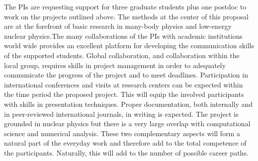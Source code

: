 The PIs are requesting support for three graduate students plus one postdoc to work on
the projects outlined above. The methods at the center of this proposal
are at the forefront of basic research in many-body physics and
low-energy nuclear physics.The many collaborations of the PIs with academic institutions world wide provides an excellent
platform for developing the communication skills of the supported
students. Global collaboration, and collaboration within the local
group, requires skills in project management in order to adequately
communicate the progress of the project and to meet
deadlines. Participation in international conferences and visits at
research centers can be expected within the time period the proposed
project. This will equip the involved participants with skills in
presentation techniques.  Proper documentation, both internally and in
peer-reviewed international journals, in writing is expected. The
project is grounded in nuclear physics but there is a very large
overlap with computational science and numerical analysis. These two
complementary aspects will form a natural part of the everyday work
and therefore add to the total competence of the
participants. Naturally, this will add to the number of possible
career paths.



